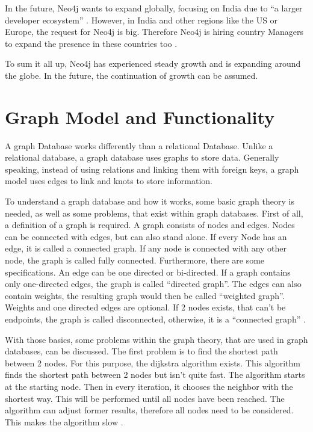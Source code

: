 In the future, Neo4j wants to expand globally, focusing on India due to \enquote{a larger developer ecosystem} \parencite{historyneo4j}. However, in India and other regions like the US or Europe, the request 
for Neo4j is big. Therefore Neo4j is hiring country Managers to expand the presence in these countries too \parencite{historyneo4j}.

To sum it all up, Neo4j has experienced steady growth and is expanding around the globe. In the future, the continuation of growth can be assumed.

\section{Graph Model and Functionality} \label{sec:graphModelFunctionalityNeo4j}

A graph Database works differently than a relational Database. Unlike a relational database, a graph database uses graphs to store data. Generally speaking, instead of using relations and linking them with foreign keys, a graph model uses edges to link and knots to store information.

To understand a graph database and how it works, some basic graph theory is needed, as well as some problems, that exist within graph databases. First of all, a definition of a graph is required. A graph consists of nodes and edges. Nodes can be connected with edges, but can also stand alone. If every Node has an edge, it is called a connected graph. If any node is connected with any other node, the graph is called fully connected.
Furthermore, there are some specifications. An edge can be one directed or bi-directed. If a graph contains only one-directed edges, the graph is called \enquote{directed graph}. The edges can also contain weights, the resulting graph would then be called \enquote{weighted graph}. Weights and one directed edges are optional. If 2 nodes exists, that can't be endpoints, the graph is called disconnected, otherwise, it is a \enquote{connected graph} \parencite{graphBasics}.

With those basics, some problems within the graph theory, that are used in graph databases, can be discussed. The first problem is to find the shortest path between 2 nodes. For this purpose, the dijkstra algorithm exists. This algorithm finds the shortest path between 2 nodes but isn't quite fast. The algorithm starts at the starting node. Then in every iteration, it chooses the neighbor with the shortest way. This will be performed until all nodes have been reached.
The algorithm can adjust former results, therefore all nodes need to be considered. This makes the algorithm slow \parencite{dijkstra}.


